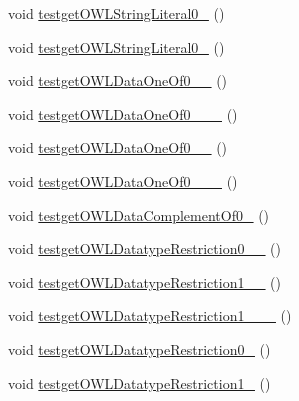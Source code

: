 \begin{DoxyCompactItemize}
\item 
void \hyperlink{classorg_1_1semanticweb_1_1owlapi_1_1api_1_1test_1_1_null_check_test_case_a7f8045592ce6b80e1883a4c3b67a6acc}{testget\-O\-W\-L\-String\-Literal0\-\_} ()
\item 
void \hyperlink{classorg_1_1semanticweb_1_1owlapi_1_1api_1_1test_1_1_null_check_test_case_a85c9eac08bf816c3a04eec8860c3f04d}{testget\-O\-W\-L\-String\-Literal0\-\_} ()
\item 
void \hyperlink{classorg_1_1semanticweb_1_1owlapi_1_1api_1_1test_1_1_null_check_test_case_ac0c281e67ff9df02976bf3e3687f097e}{testget\-O\-W\-L\-Data\-One\-Of0\-\_\-\_} ()
\item 
void \hyperlink{classorg_1_1semanticweb_1_1owlapi_1_1api_1_1test_1_1_null_check_test_case_ae3b388085c6762e7b6801bc37f000a0e}{testget\-O\-W\-L\-Data\-One\-Of0\-\_\-\_\-\_} ()
\item 
void \hyperlink{classorg_1_1semanticweb_1_1owlapi_1_1api_1_1test_1_1_null_check_test_case_ad2cd0c75417d29a3e43b499777186229}{testget\-O\-W\-L\-Data\-One\-Of0\-\_\-\_} ()
\item 
void \hyperlink{classorg_1_1semanticweb_1_1owlapi_1_1api_1_1test_1_1_null_check_test_case_a1a83bd6142e202f95144162f6969ce61}{testget\-O\-W\-L\-Data\-One\-Of0\-\_\-\_\-\_} ()
\item 
void \hyperlink{classorg_1_1semanticweb_1_1owlapi_1_1api_1_1test_1_1_null_check_test_case_ac4e22c0bbe700fee11dad5ce72e19faa}{testget\-O\-W\-L\-Data\-Complement\-Of0\-\_} ()
\item 
void \hyperlink{classorg_1_1semanticweb_1_1owlapi_1_1api_1_1test_1_1_null_check_test_case_ae7cd8a02d62605dd488813e0ba7a7be6}{testget\-O\-W\-L\-Datatype\-Restriction0\-\_\-\_} ()
\item 
void \hyperlink{classorg_1_1semanticweb_1_1owlapi_1_1api_1_1test_1_1_null_check_test_case_ae038119b87201004eb4d391fb313c161}{testget\-O\-W\-L\-Datatype\-Restriction1\-\_\-\_} ()
\item 
void \hyperlink{classorg_1_1semanticweb_1_1owlapi_1_1api_1_1test_1_1_null_check_test_case_af3e27627f9d0ff1b9259c5f982997032}{testget\-O\-W\-L\-Datatype\-Restriction1\-\_\-\_\-\_} ()
\item 
void \hyperlink{classorg_1_1semanticweb_1_1owlapi_1_1api_1_1test_1_1_null_check_test_case_a9fa28281d6780d7e4f767d459b3a9933}{testget\-O\-W\-L\-Datatype\-Restriction0\-\_} ()
\item 
void \hyperlink{classorg_1_1semanticweb_1_1owlapi_1_1api_1_1test_1_1_null_check_test_case_a5844bfb456119424262c24ea81044647}{testget\-O\-W\-L\-Datatype\-Restriction1\-\_} ()

\end{DoxyCompactItemize}
